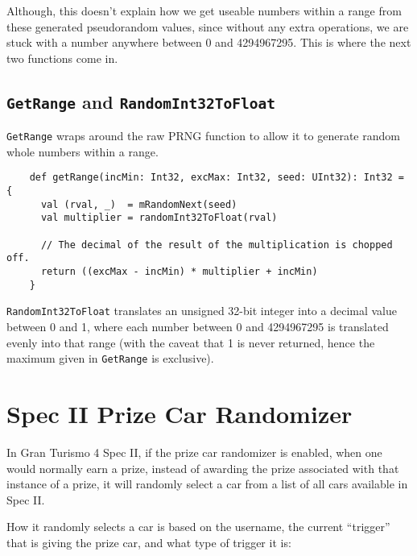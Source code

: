 \documentclass[12pt,a4paper,notitlepage]{extarticle}
\begin{document}
                Although, this doesn't explain how we get useable numbers within a range
                from these generated pseudorandom values, since without any extra operations,
                we are stuck with a number anywhere between 0 and 4294967295. This is where the
                next two functions come in.

            \subsection*{\texttt{GetRange} and \texttt{RandomInt32ToFloat}}
                \texttt{GetRange} wraps around the raw PRNG function to allow it to generate
                random whole numbers within a range.

                \begin{lstlisting}
    def getRange(incMin: Int32, excMax: Int32, seed: UInt32): Int32 = {
      val (rval, _)  = mRandomNext(seed)
      val multiplier = randomInt32ToFloat(rval)

      // The decimal of the result of the multiplication is chopped off.
      return ((excMax - incMin) * multiplier + incMin)
    }
                \end{lstlisting}

                \noindent \texttt{RandomInt32ToFloat} translates an unsigned 32-bit integer
                into a decimal value between 0 and 1, where each number between 0 and 4294967295
                is translated evenly into that range (with the caveat that 1 is never returned,
                hence the maximum given in \texttt{GetRange} is exclusive).

    \section*{Spec II Prize Car Randomizer}
        In Gran Turismo 4 Spec II, if the prize car randomizer is enabled, when one would
        normally earn a prize, instead of awarding the prize associated with that instance of
        a prize, it will randomly select a car from a list of all cars available in Spec II.

        How it randomly selects a car is based on the username, the current ``trigger'' that is
        giving the prize car, and what type of trigger it is:
\end{document}
